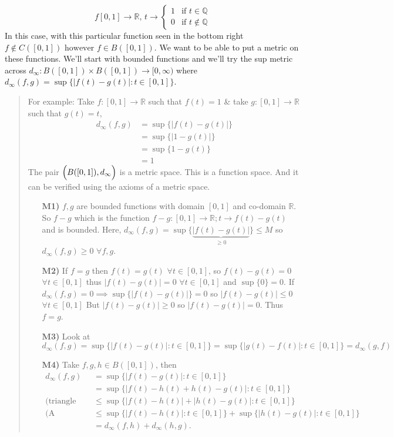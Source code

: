 \documentclass[10pt]{article}
\begin{document}
\begin{equation*}
    f[0,1]\to\mathbb{R},\,t\to
    \begin{cases}
        1 &\text{if $t\in\mathbb{Q}$}\\
        0 &\text{if $t\notin\mathbb{Q}$}
    \end{cases}
\end{equation*}
In this case, with this particular function seen in the bottom right $f\notin C([0,1])\text{ however }f\in B([0,1])$. We want to be able to put a metric on these functions. We'll start with bounded functions and we'll try the sup metric across $d_{\infty}: B([0,1])\times B([0,1])\to[0,\infty)$ where $d_{\infty}(f,g)=\sup\{|f(t)-g(t)|:t\in[0,1]\}$.
\begin{quote}
    For example: Take $f:[0,1]\to\mathbb{R}$ such that $f(t)=1$ \& take $g:[0,1]\to\mathbb{R}$ such that $g(t)=t$,
    \begin{align*}
        d_{\infty}(f,g)&=\sup\{|f(t)-g(t)|\}\\
        &=\sup\{|1-g(t)|\}\\
        &=\sup\{1-g(t)\}\\
        &=1
    \end{align*}
    The pair $\Big{(}B([0,1]),d_{\infty}\Big{)}$ is a metric space. This is a function space. And it can be verified using the axioms of a metric space. 
    \begin{enumerate}
        \item[\textbf{M1)}] $f,g$ are bounded functions with domain $[0,1]$ and co-domain $\mathbb{R}$. So $f-g$ which is the function $f-g:[0,1]\to\mathbb{R};t\to f(t)-g(t)$ and is bounded. Here, $d_{\infty}(f,g)=\sup\{\underbrace{|f(t)-g(t)|}_{\geq0}\}\leq M$ so $d_{\infty}(f,g)\geq0$ $\forall f, g$. 
        \item[\textbf{M2)}] If $f=g$ then $f(t)=g(t)$ $\forall t\in[0,1]$, so $f(t)-g(t)=0$ $\forall t\in[0,1]$ thus $|f(t)-g(t)|=0$ $\forall t\in[0,1]$ and $\sup\{0\}=0.$ If $d_{\infty}(f,g)=0\implies\sup\{|f(t)-g(t)|\}=0$ so $|f(t)-g(t)|\leq0$ $\forall t\in[0,1]$ But $|f(t)-g(t)|\geq0$ so $|f(t)-g(t)|=0$. Thus $f=g$.
        \item[\textbf{M3)}] Look at $d_{\infty}(f,g)=\sup\{|f(t)-g(t)|:t\in[0,1]\}=\sup\{|g(t)-f(t)|:t\in[0,1]\}=d_{\infty}(g,f)$
        \item[\textbf{M4)}] Take $f,g,h\in B([0,1])$, then 
        \begin{align*}
            d_{\infty}(f,g)&=\sup\{|f(t)-g(t)|:t\in[0,1]\}\\
            &=\sup\{|f(t)-h(t)+h(t)-g(t)|:t\in[0,1]\}\\
            \text{(triangle inequality) }&\leq\sup\{|f(t)-h(t)|+|h(t)-g(t)|:t\in[0,1]\}\\
            \text{(A property of sup)}&\leq\sup\{|f(t)-h(t)|:t\in[0,1]\}+\sup\{|h(t)-g(t)|:t\in[0,1]\}\\
            &=d_{\infty}(f,h)+d_{\infty}(h,g).
        \end{align*}
        
    \end{enumerate}
\end{quote}
\end{document}
